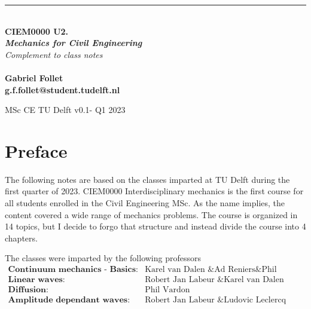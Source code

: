\documentclass[a4paper, 11pt,article,oneside]{memoir}%
\begin{document}
\noindent
\setlength{\parindent}{0pt}

\begin{titlingpage}
	\raggedleft %
	{\color{magenta}\rule{3 pt}{\textheight}} %
	\hspace{0.05\textwidth} %
	\parbox[b]{0.9\textwidth}{ %
	
		{\\\Huge\bfseries{ CIEM0000 U2.\\
		\textit{Mechanics for Civil Engineering}}}\\[3\baselineskip]  %
		{\large\textit{Complement to class notes }}\\[4\baselineskip] %
      	\\[4\baselineskip] 
		{\color{magenta}\textbf{Gabriel Follet\\g.f.follet@student.tudelft.nl}}
		
		\vspace{0.25\textheight} %
			{\noindent MSc CE TU Delft  v0.1- Q1 2023}} %

\end{titlingpage}
\section*{Preface}
The following notes are based on the classes imparted at TU Delft during the first quarter of 2023.
CIEM0000 Interdisciplinary mechanics is the first course for all students enrolled in the Civil Engineering MSc.
 As the name implies, the content covered a wide range of mechanics problems. The course is organized in 14 topics, but I decide to forgo that structure and instead divide the course into 4 chapters.

The classes were imparted by the following professors
\begin{align*}
\textbf{Continuum mechanics - Basics: }& \text{Karel van Dalen \& Ad Reniers\&  Phil Vardon}\\
\textbf{Linear waves: }&\text{Robert Jan Labeur \& Karel van Dalen}\\
\textbf{Diffusion: }&\text{Phil Vardon}\\
\textbf{Amplitude dependant waves: }&\text{Robert Jan Labeur \& Ludovic Leclercq}
\end{align*} 
\end{document}
